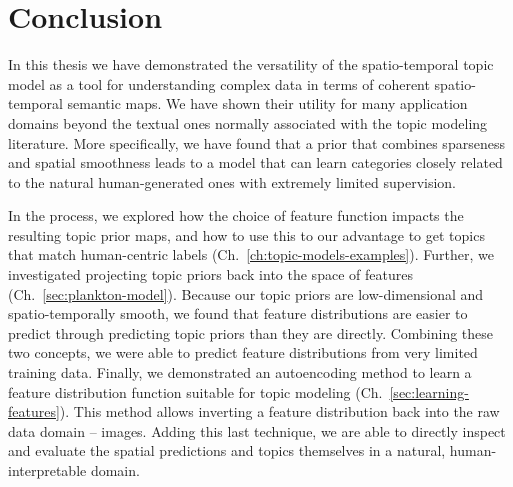 
\chapter{Conclusion} \label{ch:conclusion}

In this thesis we have demonstrated the versatility of the spatio-temporal topic model as a tool for understanding complex data in terms of coherent spatio-temporal semantic maps. We have shown their utility for many application domains beyond the textual ones normally associated with the topic modeling literature. More specifically, we have found that a prior that combines sparseness and spatial smoothness leads to a model that can learn categories closely related to the natural human-generated ones with extremely limited supervision.

In the process, we explored how the choice of feature function impacts the resulting topic prior maps, and how to use this to our advantage to get topics that match human-centric labels (Ch.~\ref{ch:topic-models-examples}). Further, we investigated projecting topic priors back into the space of features (Ch.~\ref{sec:plankton-model}). Because our topic priors are low-dimensional and spatio-temporally smooth, we found that feature distributions are easier to predict through predicting topic priors than they are directly. Combining these two concepts, we were able to predict feature distributions from very limited training data. Finally,
we demonstrated an autoencoding method to learn a feature distribution function suitable for topic modeling (Ch.~\ref{sec:learning-features}). This method allows inverting a feature distribution back into the raw data domain -- images. Adding this last technique, we are able to directly inspect and evaluate the spatial predictions and topics themselves in a natural, human-interpretable domain.

